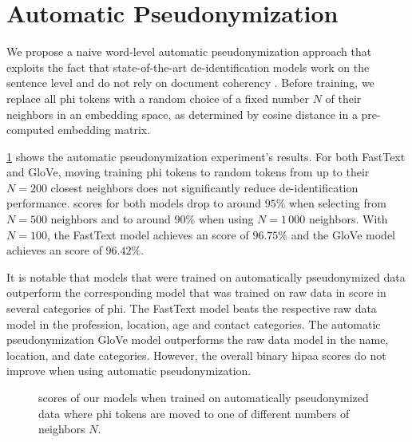 
\section{Automatic Pseudonymization}\label{sec:automatic-pseudonymization}
%
We propose a naive word-level automatic pseudonymization approach that exploits the fact that state-of-the-art de-identification models work on the sentence level and do not rely on document coherency \citep{liu2017identification,dernoncourt2017identification}.
%
Before training, we replace all \ac{phi} tokens with a random choice of a fixed number $N$ of their neighbors in an embedding space, as determined by cosine distance in a pre-computed embedding matrix.

%
\cref{fig:auto-pseudo} shows the automatic pseudonymization experiment's results. 
%
For both FastText and GloVe, moving training \ac{phi} tokens to random tokens from up to their $N=200$ closest neighbors does not significantly reduce de-identification performance.
%
\fone scores for both models drop to around $95\%$ when selecting from $N=500$ neighbors and to around $90\%$ when using $N=1\,000$ neighbors.
%
With $N=100$, the FastText model achieves an \fone score of $96.75\%$ and the GloVe model achieves an \fone score of $96.42\%$.


%
It is notable that models that were trained on automatically pseudonymized data outperform the corresponding model that was trained on raw data in \fone score in several categories of \ac{phi}.
%
The FastText model beats the respective raw data model in the profession, location, age and contact categories.
%
The automatic pseudonymization GloVe model outperforms the raw data model in the name, location, and date categories.
%
However, the overall binary \ac{hipaa} \fone scores do not improve when using automatic pseudonymization.


\begin{figure}
    \centering
    
    \caption[De-identification with automatic pseudonymization]{\fone scores of our models when trained on automatically pseudonymized data where \ac{phi} tokens are moved to one of different numbers of neighbors $N$.}\label{fig:auto-pseudo}
\end{figure}